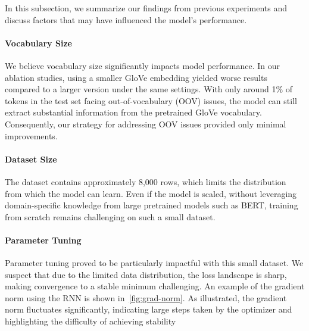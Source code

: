 In this subsection, we summarize our findings from previous experiments and discuss factors that may have influenced the model's performance.

\paragraph{Vocabulary Size} We believe vocabulary size significantly impacts model performance. In our ablation studies, using a smaller GloVe embedding yielded worse results compared to a larger version under the same settings. With only around 1\% of tokens in the test set facing out-of-vocabulary (OOV) issues, the model can still extract substantial information from the pretrained GloVe vocabulary. Consequently, our strategy for addressing OOV issues provided only minimal improvements.

\paragraph{Dataset Size} The dataset contains approximately 8,000 rows, which limits the distribution from which the model can learn. Even if the model is scaled, without leveraging domain-specific knowledge from large pretrained models such as BERT, training from scratch remains challenging on such a small dataset.

\paragraph{Parameter Tuning} Parameter tuning proved to be particularly impactful with this small dataset. We suspect that due to the limited data distribution, the loss landscape is sharp, making convergence to a stable minimum challenging. An example of the gradient norm using the RNN is shown in~\cref{fig:grad-norm}. As illustrated, the gradient norm fluctuates significantly, indicating large steps taken by the optimizer and highlighting the difficulty of achieving stability